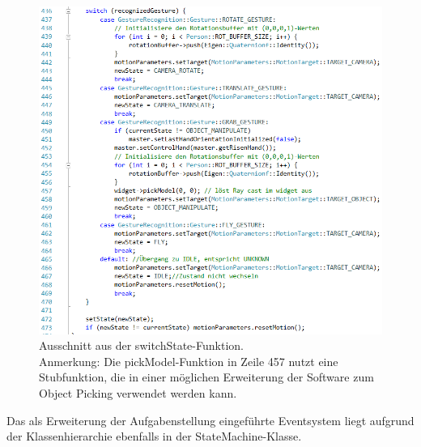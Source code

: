 	\begin{figure}[h]
	\centering
	\includegraphics[width=.9\textwidth]{pictures/switchstate.png}
	\caption{Ausschnitt aus der switchState-Funktion.\\Anmerkung: Die pickModel-Funktion in Zeile 457 nutzt eine Stubfunktion, die in einer möglichen Erweiterung der Software zum Object Picking verwendet werden kann.}\label{fig:switchstate}
	\end{figure}
	Das als Erweiterung der Aufgabenstellung eingeführte Eventsystem liegt aufgrund der Klassenhierarchie ebenfalls in der StateMachine-Klasse.